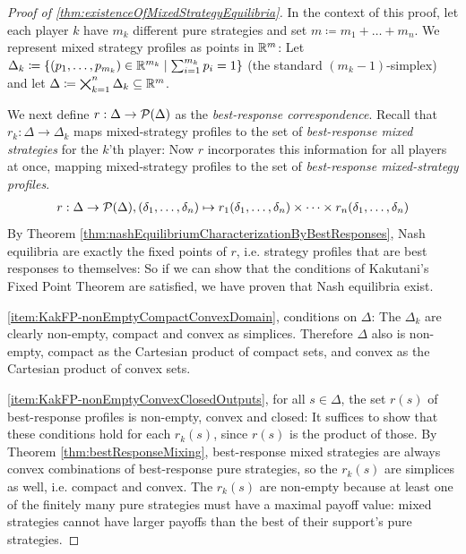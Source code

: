 \documentclass[a4paper]{scrreprt}
\begin{document}
    \begin{proof}[Proof of \ref{thm:existenceOfMixedStrategyEquilibria}]
        In the context of this proof, let each player $k$ have $m_k$ different pure strategies and set $m \coloneqq m_1 + \dots + m_n$.
        We represent mixed strategy profiles as points in $\mathbb{R}^m$: Let $\Delta_k \coloneqq \{(p_1, \dots, p_{m_k}) \in \mathbb{R}^{m_k} \mid \sum_{i=1}^{m_k} p_i = 1\}$ (the standard $(m_k - 1)$-simplex) and let $\Delta \coloneqq \bigtimes_{k=1}^n \Delta_k \subseteq \mathbb{R}^m$.
        
        We next define $r: \Delta \to \operatorname{\mathcal{P}}(\Delta)$ as the \emph{best-response correspondence}. Recall that $r_k: \Delta \to \Delta_k$ maps mixed-strategy profiles to the set of \emph{best-response mixed strategies} for the $k$'th player: Now $r$ incorporates this information for all players at once, mapping mixed-strategy profiles to the set of \emph{best-response mixed-strategy profiles}.
        \begin{gather}
            r: \Delta \to \operatorname{\mathcal{P}}(\Delta), (\delta_1, \dots, \delta_n) \mapsto r_1(\delta_1, \dots, \delta_n) \times \dots \times r_n(\delta_1, \dots, \delta_n)
            \label{eq:bestResponseCorresponenceDefinition}
        \end{gather}
        By Theorem \ref{thm:nashEquilibriumCharacterizationByBestResponses}, Nash equilibria are exactly the fixed points of $r$, i.e. strategy profiles that are best responses to themselves: So if we can show that the conditions of Kakutani's Fixed Point Theorem are satisfied, we have proven that Nash equilibria exist.
        
        \ref{item:KakFP-nonEmptyCompactConvexDomain}, conditions on $\Delta$: The $\Delta_k$ are clearly non-empty, compact and convex as simplices. Therefore $\Delta$ also is non-empty,
        compact as the Cartesian product of compact sets, and convex as the Cartesian product of convex sets. %
        
        \ref{item:KakFP-nonEmptyConvexClosedOutputs}, for all $s \in \Delta$, the set $r(s)$ of best-response profiles is non-empty, convex and closed: It suffices to show that these conditions hold for each $r_k(s)$, since $r(s)$ is the product of those. By Theorem \ref{thm:bestResponseMixing}, best-response mixed strategies are always convex combinations of best-response pure strategies, so the $r_k(s)$ are simplices as well, i.e. compact and convex. The $r_k(s)$ are non-empty because at least one of the finitely many pure strategies must have a maximal payoff value: mixed strategies cannot have larger payoffs than the best of their support's pure strategies.
        

\end{proof}
\end{document}
